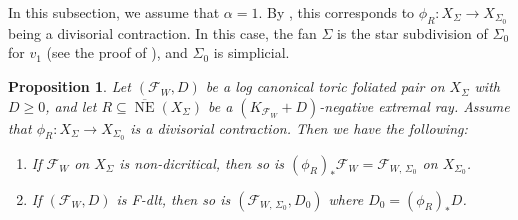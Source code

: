 \documentclass[12pt,reqno]{amsart}
\newtheorem{proposition}[theorem]{Proposition}
\theoremstyle{definition}
\newcommand{\on}{\operatorname}
\newcommand\cF{{\mathcal{F}}}
\begin{document}
In this subsection, we assume that $\alpha=1$. By \cite[Proposition 15.4.5]{CLS11}, this corresponds to $\phi_R\colon X_\Sigma\to X_{\Sigma_0}$ being a divisorial contraction. In this case, the fan $\Sigma$ is the star subdivision of $\Sigma_0$ for $v_1$ (see the proof of \cite[Proposition 15.4.5]{CLS11}), and $\Sigma_0$ is simplicial. 
\begin{proposition}\label{div_contr}
    Let $(\cF_W,D)$ be a log canonical toric foliated pair on $X_\Sigma$ with $D\geq 0$, and let $R\subseteq\overline{\on{NE}}(X_\Sigma)$ be a $(K_{\cF_W}+D)$-negative extremal ray.  
    Assume that $\phi_R\colon X_\Sigma\to X_{\Sigma_0}$ is a divisorial contraction. 
    Then we have the following: 
    \begin{enumerate}
        \item If $\cF_{W}$ on $X_\Sigma$ is non-dicritical, then so is $(\phi_R)_*\cF_{W} = \cF_{W,\,\Sigma_0}$ on $X_{\Sigma_0}$. 
        \item If $(\cF_{W},D)$ is F-dlt, then so is $(\cF_{W,\,\Sigma_0},D_0)$ where $D_0=(\phi_R)_*D$. 
    \end{enumerate}
    
\end{proposition}
\end{document}
